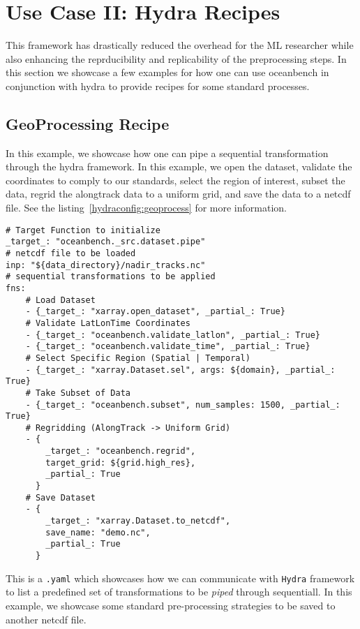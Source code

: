 \section{Use Case II: Hydra Recipes} \label{sec:hydra_recipes}

This framework has drastically reduced the overhead for the ML researcher while also enhancing the reprducibility and replicability of the preprocessing steps. In this section we showcase a few examples for how one can use oceanbench in conjunction with hydra to provide recipes for some standard processes.

\subsection{GeoProcessing Recipe}

In this example, we showcase how one can pipe a sequential transformation through the hydra framework. In this example, we open the dataset, validate the coordinates to comply to our standards, select the region of interest, subset the data, regrid the alongtrack data to a uniform grid, and save the data to a netcdf file. See the listing~\ref{hydraconfig:geoprocess} for more information.


\begin{listing}[ht!]
\begin{verbatim}
# Target Function to initialize
_target_: "oceanbench._src.dataset.pipe"
# netcdf file to be loaded
inp: "${data_directory}/nadir_tracks.nc"
# sequential transformations to be applied
fns:
    # Load Dataset
    - {_target_: "xarray.open_dataset", _partial_: True}
    # Validate LatLonTime Coordinates
    - {_target_: "oceanbench.validate_latlon", _partial_: True}
    - {_target_: "oceanbench.validate_time", _partial_: True}
    # Select Specific Region (Spatial | Temporal)
    - {_target_: "xarray.Dataset.sel", args: ${domain}, _partial_: True}
    # Take Subset of Data
    - {_target_: "oceanbench.subset", num_samples: 1500, _partial_: True}
    # Regridding (AlongTrack -> Uniform Grid)
    - {
        _target_: "oceanbench.regrid", 
        target_grid: ${grid.high_res}, 
        _partial_: True
      }
    # Save Dataset
    - {
        _target_: "xarray.Dataset.to_netcdf", 
        save_name: "demo.nc", 
        _partial_: True
      }
\end{verbatim}
\label{hydraconfig:geoprocess}
\caption{This is a \texttt{.yaml} which showcases how we can communicate with \texttt{Hydra} framework to list a predefined set of transformations to be \textit{piped} through sequentiall. In this example, we showcase some standard pre-processing strategies to be saved to another netcdf file.}
\end{listing}




